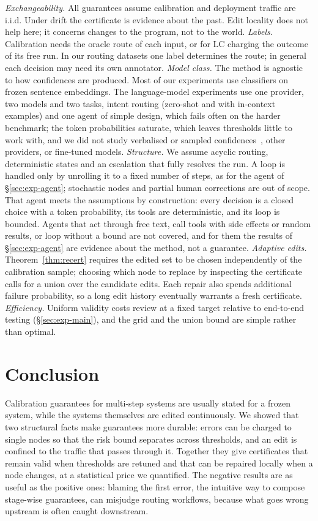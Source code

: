 \documentclass[11pt]{article}
\theoremstyle{definition}
\theoremstyle{remark}
\begin{document}
\emph{Exchangeability.} All guarantees assume calibration and deployment traffic are i.i.d.
Under drift the certificate is evidence about the past. Edit locality does not help here; it
concerns changes to the program, not to the world.
\emph{Labels.} Calibration needs the oracle route of each input, or for LC charging the
outcome of its free run. In our routing datasets one label determines the route; in general
each decision may need its own annotator.
\emph{Model class.} The method is agnostic to how confidences are produced. Most of our
experiments use classifiers on frozen sentence embeddings. The language-model experiments use
one provider, two models and two tasks, intent routing (zero-shot and with in-context
examples) and one agent of simple design, which fails often on the harder benchmark; the token
probabilities saturate, which leaves thresholds little to work with, and we did not study
verbalised or sampled confidences~\citep{tian2023just,xiong2024can}, other providers, or
fine-tuned models.
\emph{Structure.} We assume acyclic routing, deterministic states and an escalation that fully
resolves the run. A loop is handled only by unrolling it to a fixed number of steps, as for
the agent of \S\ref{sec:exp-agent}; stochastic nodes and partial human corrections are out of
scope. That agent meets the assumptions by construction: every decision is a closed choice
with a token probability, its tools are deterministic, and its loop is bounded. Agents that
act through free text, call tools with side effects or random results, or loop without a
bound are not covered, and for them the results of \S\ref{sec:exp-agent} are evidence about
the method, not a guarantee.
\emph{Adaptive edits.} Theorem~\ref{thm:recert} requires the edited set to be chosen
independently of the calibration sample; choosing which node to replace by inspecting the
certificate calls for a union over the candidate edits. Each repair also spends additional
failure probability, so a long edit history eventually warrants a fresh certificate.
\emph{Efficiency.} Uniform validity costs review at a fixed target relative to end-to-end
testing (\S\ref{sec:exp-main}), and the grid and the union bound are simple rather than
optimal.

\section{Conclusion}

Calibration guarantees for multi-step systems are usually stated for a frozen system, while
the systems themselves are edited continuously. We showed that two structural facts make
guarantees more durable: errors can be charged to single nodes so that the risk bound
separates across thresholds, and an edit is confined to the traffic that passes through it.
Together they give certificates that remain valid when thresholds are retuned and that can be
repaired locally when a node changes, at a statistical price we quantified. The negative
results are as useful as the positive ones: blaming the first error, the intuitive way to
compose stage-wise guarantees, can misjudge routing workflows, because what goes wrong
upstream is often caught downstream.
\end{document}
